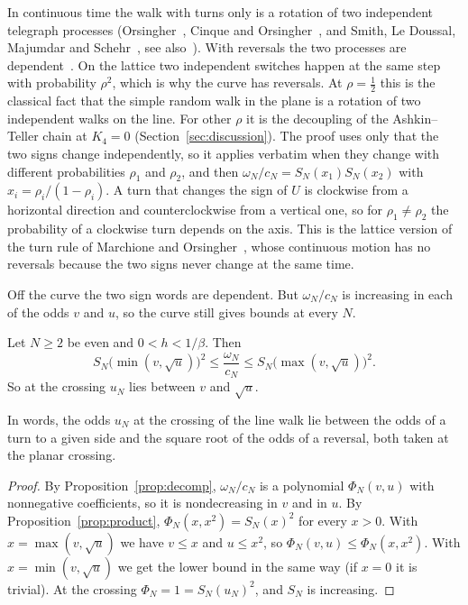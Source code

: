 In continuous time the walk with turns only is a rotation of two independent telegraph processes
(Orsingher~\cite{orsingher2000}, Cinque and Orsingher~\cite[Theorem~2.2]{cinqueorsingher2023}, and
Smith, Le Doussal, Majumdar and Schehr~\cite{sldms2022}, see also~\cite[Eq.~(36)]{angelani2022}).
With reversals the two processes are dependent~\cite[Section~3]{cinqueorsingher2023}. On the lattice two
independent switches happen at the same step with probability $\rho^2$, which is why the curve has
reversals. At $\rho=\frac12$ this is the classical fact that the simple random walk in the plane is
a rotation of two independent walks on the line. For other $\rho$ it is the
decoupling of the Ashkin--Teller chain at $K_4=0$ (Section~\ref{sec:discussion}).
The proof uses only that the two signs change independently, so it applies
verbatim when they change with different probabilities $\rho_1$ and $\rho_2$,
and then $\omega_N/c_N=S_N(x_1)S_N(x_2)$ with $x_i=\rho_i/(1-\rho_i)$. A turn that
changes the sign of $U$ is clockwise from a horizontal direction and
counterclockwise from a vertical one, so for $\rho_1\ne\rho_2$ the probability
of a clockwise turn depends on the axis. This is the lattice version of the
turn rule of Marchione and Orsingher~\cite{marchioneorsingher2024}, whose
continuous motion has no reversals because the two signs never change at the
same time.

Off the curve the two sign words are dependent. But $\omega_N/c_N$ is increasing in each of the odds $v$
and $u$, so the curve still gives bounds at every $N$.

\begin{corollary}\label{cor:productcompare}
Let $N\ge2$ be even and $0<h<1/\beta$. Then
\[
 S_N\bigl(\min(v,\sqrt u)\bigr)^2\le\frac{\omega_N}{c_N}\le S_N\bigl(\max(v,\sqrt u)\bigr)^2 .
\]
So at the crossing $u_N$ lies between $v$ and $\sqrt u$.
\end{corollary}

In words, the odds $u_N$ at the crossing of the line walk lie between the odds of a turn to a
given side and the square root of the odds of a reversal, both taken at the planar crossing.

\begin{proof}
By Proposition~\ref{prop:decomp}, $\omega_N/c_N$ is a polynomial $\Phi_N(v,u)$ with nonnegative
coefficients, so it is nondecreasing in $v$ and in $u$. By Proposition~\ref{prop:product},
$\Phi_N(x,x^2)=S_N(x)^2$ for every $x>0$. With $x=\max(v,\sqrt u)$ we have $v\le x$ and $u\le x^2$, so
$\Phi_N(v,u)\le \Phi_N(x,x^2)$. With $x=\min(v,\sqrt u)$ we get the lower bound in the same way (if $x=0$
it is trivial). At the crossing $\Phi_N=1=S_N(u_N)^2$, and $S_N$ is increasing.
\end{proof}

